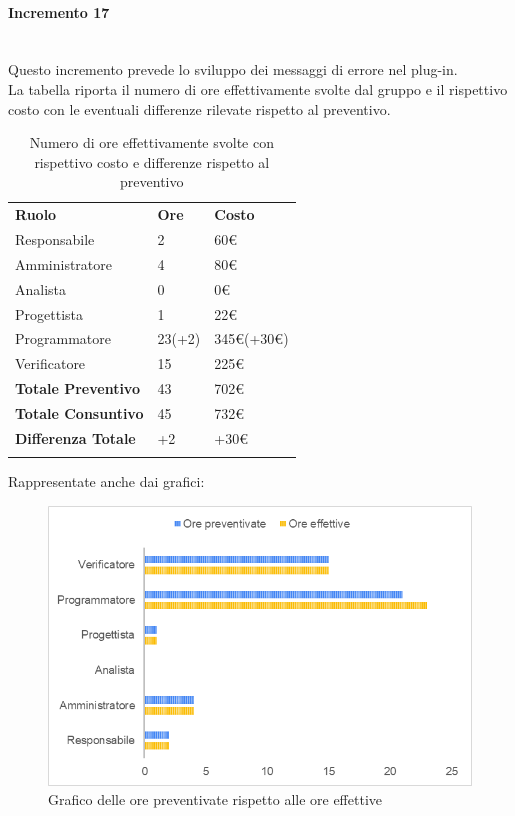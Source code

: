 \paragraph{Incremento 17}  \mbox{} \\
Questo incremento prevede lo sviluppo dei messaggi di errore nel plug-in. \\
La tabella riporta il numero di ore effettivamente svolte dal gruppo e il rispettivo costo con le eventuali differenze rilevate rispetto al preventivo.
\begin{longtable} {							
		>{}p{40mm}  
		>{}p{20mm}	
		>{}p{28mm}			
	}			
	\rowcolor{gray!50}
	
	\textbf{Ruolo}            & \textbf{Ore} & \textbf{Costo}       \TBstrut \\
	Responsabile              & 2            & 60\euro             \TBstrut \\
	Amministratore            & 4            & 80\euro              \TBstrut \\
	Analista                  & 0            & 0\euro             \TBstrut \\
	Progettista               & 1            & 22\euro   \TBstrut \\
	Programmatore             & 23(+2)       & 345\euro(+30\euro)             \TBstrut \\
	Verificatore              & 15           & 225\euro             \TBstrut \\
	\textbf{Totale Preventivo}& 43           & 702\euro            \TBstrut \\	
	\textbf{Totale Consuntivo}& 45           & 732\euro            \TBstrut \\	
	\textbf{Differenza Totale}& +2           & +30\euro             \TBstrut \\
	\rowcolor{white}
	\caption{Numero di ore effettivamente svolte con rispettivo costo e differenze rispetto al preventivo}	
\end{longtable}

Rappresentate anche dai grafici:
\begin{figure} [H]
	\includegraphics[width=\linewidth]{./img/Grafici/ra-consuntivo5.png}
	\caption{Grafico delle ore preventivate rispetto alle ore effettive}
\end{figure}


